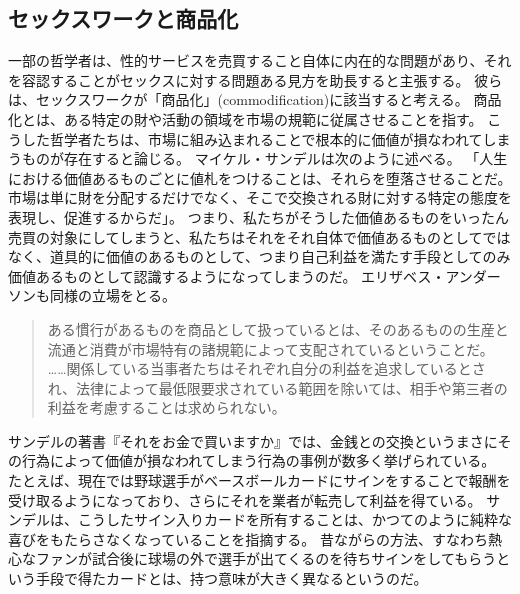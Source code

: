 \documentclass[paper=a4,book,openany]{jlreq}
\newcommand{\ig}[1]{}           %
\begin{document}
\subsection{セックスワークと商品化}

一部の哲学者は、性的サービスを売買すること自体に内在的な問題があり、それを容認することがセックスに対する問題ある見方を助長すると主張する。
彼らは、セックスワークが「商品化」(commodification)に該当すると考える。
商品化とは、ある特定の財や活動の領域を市場の規範に従属させることを指す。
こうした哲学者たちは、市場に組み込まれることで根本的に価値が損なわれてしまうものが存在すると論じる。
マイケル・サンデルは次のように述べる。
「人生における価値あるものごとに値札をつけることは、それらを堕落させることだ。
市場は単に財を分配するだけでなく、そこで交換される財に対する特定の態度を表現し、促進するからだ」\citep[p.9]{sandel12:money_cant_buy}。
つまり、私たちがそうした価値あるものをいったん売買の対象にしてしまうと、私たちはそれをそれ自体で価値あるものとしてではなく、道具的に価値のあるものとして、つまり自己利益を満たす手段としてのみ価値あるものとして認識するようになってしまうのだ。
エリザベス・アンダーソン\ig{Elizabeth Anderson}も同様の立場をとる。

\begin{quote}

ある慣行があるものを商品として扱っているとは、そのあるものの生産と流通と消費が市場特有の諸規範によって支配されているということだ。
……関係している当事者たちはそれぞれ自分の利益を追求しているとされ、法律によって最低限要求されている範囲を除いては、相手や第三者の利益を考慮することは求められない。
\citep[pp.19--20]{anderson00:_why_commer_surrog_mother_uneth}

\end{quote}

サンデルの著書『それをお金で買いますか』\citep{sandel12:money_cant_buy}では、金銭との交換というまさにその行為によって価値が損なわれてしまう行為の事例が数多く挙げられている。
たとえば、現在では野球選手がベースボールカードにサインをすることで報酬を受け取るようになっており、さらにそれを業者が転売して利益を得ている。
サンデルは、こうしたサイン入りカードを所有することは、かつてのように純粋な喜びをもたらさなくなっていることを指摘する。
昔ながらの方法、すなわち熱心なファンが試合後に球場の外で選手が出てくるのを待ちサインをしてもらうという手段で得たカードとは、持つ意味が大きく異なるというのだ。
\end{document}
